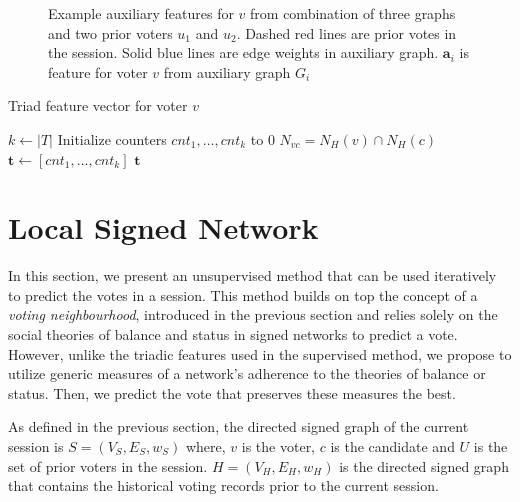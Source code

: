 \begin{figure}[!ht]
    \centering
    
    \caption{Example auxiliary features for $v$ from combination of three graphs and two prior voters $u_1$ and $u_2$. Dashed red lines are prior votes in the session. Solid blue lines are edge weights in auxiliary graph. $\mathbf{a}_i$ is feature for voter $v$ from auxiliary graph $G_i$}
    \label{fig:linear-combination of graphs}
\end{figure}

\begin{algorithm}[H]
    \DontPrintSemicolon
    \caption{Triad feature vector for voter $v$ }
    \label{alg:triad-feature}
    $k \leftarrow |T|$\;
    Initialize counters $cnt_1,\dots,cnt_k$ to 0\;
    $N_{vc} = N_H(v) \cap N_H(c)$ 
    $\mathbf{t} \leftarrow [cnt_1,\dots,cnt_k]$ \;
    \Return $\mathbf{t}$
\end{algorithm}


\section{Local Signed Network}


\label{sec:local-signed-network-theory}
In this section, we present an unsupervised method that can be used iteratively to predict the votes in a session.
This method builds on top the concept of a \textit{voting neighbourhood}, introduced in the previous section and relies solely on the social theories of balance and status in signed networks to predict a vote.
However, unlike the triadic features used in the supervised method, we propose to utilize generic measures of a network's adherence to the theories of balance or status.
Then, we predict the vote that preserves these measures the best. 

As defined in the previous section, the directed signed graph of the current session is $S = (V_S,E_S,w_S)$ where, $v$ is the voter, $c$ is the candidate and $U$ is the set of prior voters in the session. $H=(V_H,E_H,w_H)$ is the directed signed graph that contains the historical voting records prior to the current session.

